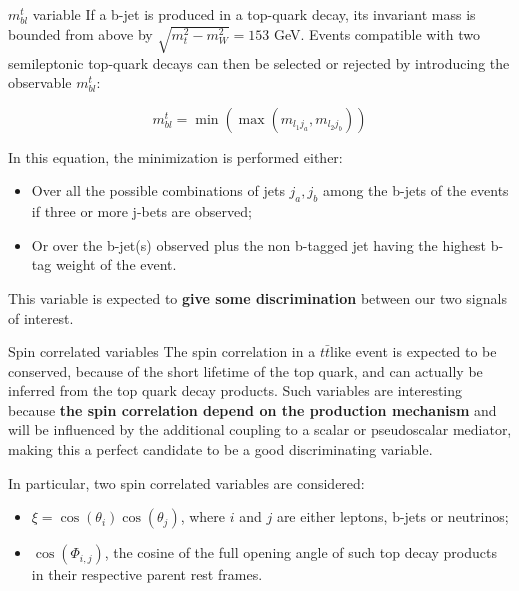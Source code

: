 \documentclass[8pt]{beamer}
\begin{document}
\begin{frame}{$m_{bl}^t$ variable}
\justifying
If a b-jet is produced in a top-quark decay, its invariant mass is bounded from above by $\sqrt{m_t^2 - m_{W}^2} = 153$ GeV. Events compatible with two semileptonic top-quark decays can then be selected or rejected by introducing the observable $m_{bl}^t$: \vfill

\begin{equation*}
m_{bl}^t = \min \left (\max(m_{l_1 j_a}, m_{l_2 j_b}) \right)
\end{equation*} \vfill

In this equation, the minimization is performed either:
\begin{itemize}
\justifying
\item Over all the possible combinations of jets {$j_a, j_b$} among the b-jets of the events if three or more j-bets are observed;
\item Or over the b-jet(s) observed plus the non b-tagged jet having the highest b-tag weight of the event.
\end{itemize} \vfill 

This variable is expected to \textbf{give some discrimination} between our two signals of interest. \vfill
\end{frame}

\begin{frame}{Spin correlated variables}
\justifying
The spin correlation in a $t \bar t$like event is expected to be conserved, because of the short lifetime of the top quark, and can actually be inferred from the top quark decay products. \vfill
Such variables are interesting because \textbf{the spin correlation depend on the production mechanism} and will be influenced by
the additional coupling to a scalar or pseudoscalar mediator, making this a perfect candidate to be a good discriminating variable. \vfill

In particular, two spin correlated variables are considered:
\begin{itemize}
\justifying
\item $\xi = \cos(\theta_i) \cos(\theta_j)$, where $i$ and $j$ are either leptons, b-jets or neutrinos;
\item $\cos(\Phi_{i,j})$, the cosine of the full opening angle of such top decay products in their respective parent rest frames.
\end{itemize}
\end{frame}
\end{document}
